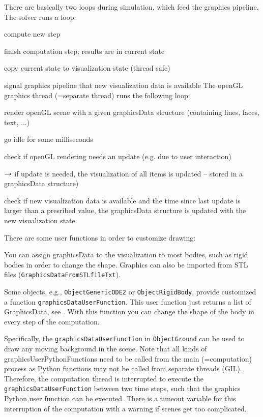 There are basically two loops during simulation, which feed the graphics pipeline.
The solver runs a loop:
\bi
  \item compute new step
  \item finish computation step; results are in current state
  \item copy current state to visualization state (thread safe)
  \item signal graphics pipeline that new visualization data is available
\ei
The openGL graphics thread (=separate thread) runs the following loop:
\bi
  \item render openGL scene with a given graphicsData structure (containing lines, faces, text, ...)
  \item go idle for some milliseconds
  \item check if openGL rendering needs an update (e.g. due to user interaction)
  \item[] $\rightarrow$ if update is needed, the visualization of all items is updated -- stored in a graphicsData structure)
  \item check if new visualization data is available and the time since last update is larger than a presribed value, the graphicsData structure is updated with the new visualization state
\ei

There are some user functions in order to customize drawing:
\bi
  \item You can assign graphicsData to the visualization to most bodies, such as rigid bodies in order to change the shape. Graphics can also be imported from STL files (\texttt{GraphicsDataFromSTLfileTxt}).
  \item Some objects, e.g., \texttt{ObjectGenericODE2} or \texttt{ObjectRigidBody}, provide customized a function \texttt{graphicsDataUserFunction}. This user function just returns a list of GraphicsData, see . With this function you can change the shape of the body in every step of the computation.
  \item Specifically, the \texttt{graphicsDataUserFunction} in \texttt{ObjectGround} can be used to draw any moving background in the scene.
\ei
Note that all kinds of graphicsUserPythonFunctions need to be called from the main (=computation) process as Python functions may not be called from separate threads (GIL). Therefore, the computation thread is interrupted to execute the \texttt{graphicsDataUserFunction} between two time steps, such that the graphics Python user function can be executed. There is a timeout variable for this interruption of the computation with a warning if scenes get too complicated.

